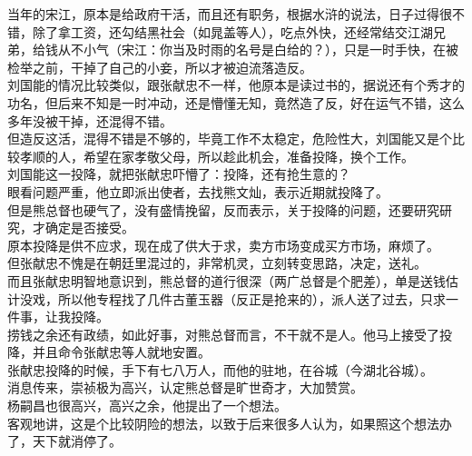 \begin{multicols}{\theparacolNo}
当年的宋江，原本是给政府干活，而且还有职务，根据水浒的说法，日子过得很不错，除了拿工资，还勾结黑社会（如晁盖等人），吃点外快，还经常结交江湖兄弟，给钱从不小气（宋江：你当及时雨的名号是白给的？），只是一时手快，在被检举之前，干掉了自己的小妾，所以才被迫流落造反。\\

刘国能的情况比较类似，跟张献忠不一样，他原本是读过书的，据说还有个秀才的功名，但后来不知是一时冲动，还是懵懂无知，竟然造了反，好在运气不错，这么多年没被干掉，还混得不错。\\

但造反这活，混得不错是不够的，毕竟工作不太稳定，危险性大，刘国能又是个比较孝顺的人，希望在家孝敬父母，所以趁此机会，准备投降，换个工作。\\

刘国能这一投降，就把张献忠吓懵了：投降，还有抢生意的？\\

眼看问题严重，他立即派出使者，去找熊文灿，表示近期就投降了。\\

但是熊总督也硬气了，没有盛情挽留，反而表示，关于投降的问题，还要研究研究，才确定是否接受。\\

原本投降是供不应求，现在成了供大于求，卖方市场变成买方市场，麻烦了。\\

但张献忠不愧是在朝廷里混过的，非常机灵，立刻转变思路，决定，送礼。\\

而且张献忠明智地意识到，熊总督的道行很深（两广总督是个肥差），单是送钱估计没戏，所以他专程找了几件古董玉器（反正是抢来的），派人送了过去，只求一件事，让我投降。\\

捞钱之余还有政绩，如此好事，对熊总督而言，不干就不是人。他马上接受了投降，并且命令张献忠等人就地安置。\\

张献忠投降的时候，手下有七八万人，而他的驻地，在谷城（今湖北谷城）。\\

消息传来，崇祯极为高兴，认定熊总督是旷世奇才，大加赞赏。\\

杨嗣昌也很高兴，高兴之余，他提出了一个想法。\\

客观地讲，这是个比较阴险的想法，以致于后来很多人认为，如果照这个想法办了，天下就消停了。\\


\end{multicols}
